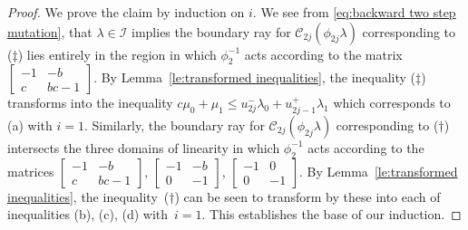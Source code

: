 \documentclass{amsart}
\numberwithin{theorem}{section}
\newcommand{\cC}{\mathcal{C}}
\newcommand{\cI}{\mathcal{I}}
\begin{document}
\begin{proof}
    We prove the claim by induction on $i$.
    We see from \eqref{eq:backward two step mutation}, that $\lambda\in\cI$ implies the boundary ray for $\cC_{2j}(\phi_{2j}\lambda)$ corresponding to ($\ddagger$) lies entirely in the region in which $\phi_2^{-1}$ acts according to the matrix $\left[ \begin{array}{cc} -1 & -b\\ c & bc-1 \end{array}\right]$.
    By Lemma~\ref{le:transformed inequalities}, the inequality ($\ddagger$) transforms into the inequality $c\mu_0+\mu_1\le u_{2j}^-\lambda_0+u_{2j-1}^+\lambda_1$ which corresponds to (a) with $i=1$.
    Similarly, the boundary ray for $\cC_{2j}(\phi_{2j}\lambda)$ corresponding to ($\dagger$) intersects the three domains of linearity in which $\phi_2^{-1}$ acts according to the matrices $\left[ \begin{array}{cc} -1 & -b\\ c & bc-1 \end{array}\right]$, $\left[ \begin{array}{cc} -1 & -b\\ 0 & -1 \end{array}\right]$, $\left[ \begin{array}{cc} -1 & 0\\ 0 & -1 \end{array}\right]$.
    By Lemma~\ref{le:transformed inequalities}, the inequality~($\dagger$) can be seen to transform by these into each of inequalities (b), (c), (d) with~$i=1$.
    This establishes the base of our induction.


\end{proof}
\end{document}
